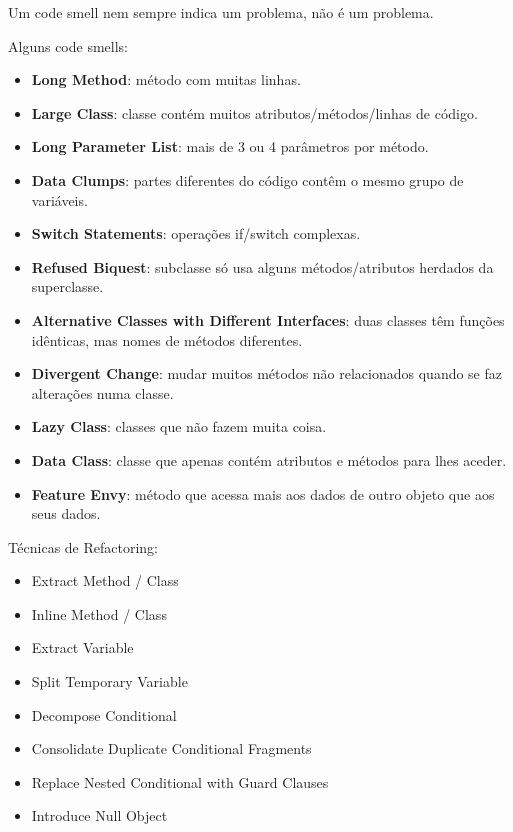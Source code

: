 \documentclass[../resumosLPOO.tex]{subfiles}
\begin{document}
 

Um code smell nem sempre indica um problema, não é um problema.

Alguns code smells:
\begin{itemize}
    \item \textbf{Long Method}: método com muitas linhas.
    \item \textbf{Large Class}: classe contém muitos atributos/métodos/linhas de código.
    \item \textbf{Long Parameter List}: mais de 3 ou 4 parâmetros por método.
    \item \textbf{Data Clumps}: partes diferentes do código contêm o mesmo grupo de variáveis.
    \item \textbf{Switch Statements}: operações if/switch complexas.
    \item \textbf{Refused Biquest}: subclasse só usa alguns métodos/atributos herdados da superclasse.
    \item \textbf{Alternative Classes with Different Interfaces}: duas classes têm funções idênticas, mas nomes de métodos diferentes.
    \item \textbf{Divergent Change}: mudar muitos métodos não relacionados quando se faz alterações numa classe.
    \item \textbf{Lazy Class}: classes que não fazem muita coisa.
    \item \textbf{Data Class}: classe que apenas contém atributos e métodos para lhes aceder.
    \item \textbf{Feature Envy}: método que acessa mais aos dados de outro objeto que aos seus dados.
\end{itemize}

Técnicas de Refactoring:
\begin{itemize}
    \item Extract Method / Class
    \item Inline Method / Class
    \item Extract Variable
    \item Split Temporary Variable
    \item Decompose Conditional
    \item Consolidate Duplicate Conditional Fragments
    \item Replace Nested Conditional with Guard Clauses
    \item Introduce Null Object
\end{itemize}
\end{document}
